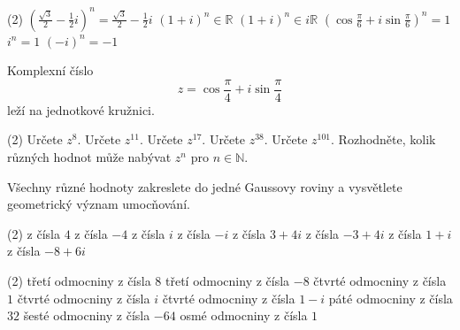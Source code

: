 \documentclass[12pt,a4paper]{article}
\begin{document}
\begin{exercise}
        \begin{tasks}(2)
            \task $\left(\frac{\sqrt3}{2}-\frac12i\right)^n=
                   \frac{\sqrt3}{2}-\frac12i$
            \task $(1+i)^n\in\mathbb{R}$
            \task $(1+i)^n\in i\mathbb{R}$
            \task $\left(\cos\frac{\pi}{6}+i\sin\frac{\pi}{6}\right)^n=1$
            \task $i^n=1$
            \task $(-i)^n=-1$
        \end{tasks}
\end{exercise}


\begin{exercise}
    Komplexní číslo
    \[
        z=\cos\frac{\pi}{4}+i\sin\frac{\pi}{4}
    \]
    leží na jednotkové kružnici.

        \begin{tasks}(2)
            \task Určete $z^8$.
            \task Určete $z^{11}$.
            \task Určete $z^{17}$.
            \task Určete $z^{38}$.
            \task Určete $z^{101}$.
            \task Rozhodněte, kolik různých hodnot může nabývat $z^n$ pro $n\in\mathbb{N}$.
        \end{tasks}

        Všechny různé hodnoty zakreslete do jedné Gaussovy roviny a vysvětlete
        geometrický význam umocňování.
\end{exercise}


\begin{exercise}
    \begin{tasks}(2)
        \task z čísla $4$
        \task z čísla $-4$
        \task z čísla $i$
        \task z čísla $-i$
        \task z čísla $3+4i$
        \task z čísla $-3+4i$
        \task z čísla $1+i$
        \task z čísla $-8+6i$
    \end{tasks}
\end{exercise}


\begin{exercise}
    \begin{tasks}(2)
        \task třetí odmocniny z čísla $8$
        \task třetí odmocniny z čísla $-8$
        \task čtvrté odmocniny z čísla $1$
        \task čtvrté odmocniny z čísla $i$
        \task čtvrté odmocniny z čísla $1-i$
        \task páté odmocniny z čísla $32$
        \task šesté odmocniny z čísla $-64$
        \task osmé odmocniny z čísla $1$
    \end{tasks}
\end{exercise}
\end{document}
